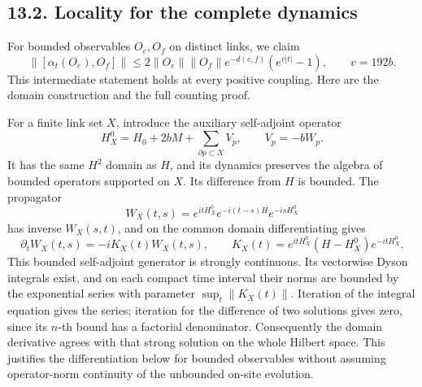 \documentclass[
]{article}
\begin{document}
\subsection{13.2. Locality for the complete
dynamics}\label{locality-for-the-complete-dynamics}

For bounded observables \(O_e,O_f\) on distinct links, we claim \[
\|[\alpha_t(O_e),O_f]\|
\le2\|O_e\|\|O_f\|e^{-d(e,f)}
       (e^{v|t|}-1),\qquad v=192b.                           \tag{13.5}
\] This intermediate statement holds at every positive coupling. Here
are the domain construction and the full counting proof.

For a finite link set \(X\), introduce the auxiliary self-adjoint
operator \[
H_X^0=H_0+2bM+\sum_{\partial p\subset X}V_p,\qquad V_p=-bW_p.
\] It has the same \(H^2\) domain as \(H\), and its dynamics preserves
the algebra of bounded operators supported on \(X\). Its difference from
\(H\) is bounded. The propagator \[
W_X(t,s)=e^{itH_X^0}e^{-i(t-s)H}e^{-isH_X^0}
\] has inverse \(W_X(s,t)\), and on the common domain differentiating
gives \[
\partial_tW_X(t,s)=-iK_X(t)W_X(t,s),\qquad
K_X(t)=e^{itH_X^0}(H-H_X^0)e^{-itH_X^0}.
\] This bounded self-adjoint generator is strongly continuous. Its
vectorwise Dyson integrals exist, and on each compact time interval
their norms are bounded by the exponential series with parameter
\(\sup_t\|K_X(t)\|\). Iteration of the integral equation gives the
series; iteration for the difference of two solutions gives zero, since
its \(n\)-th bound has a factorial denominator. Consequently the domain
derivative agrees with that strong solution on the whole Hilbert space.
This justifies the differentiation below for bounded observables without
assuming operator-norm continuity of the unbounded on-site evolution.
\end{document}
